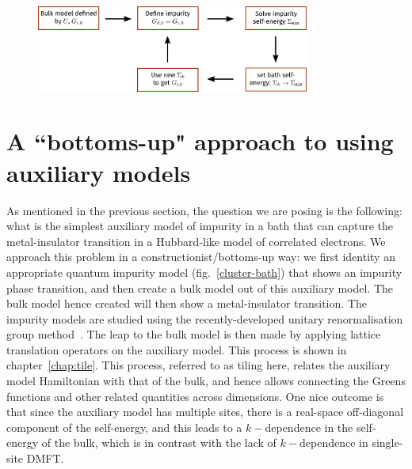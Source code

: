 \documentclass{report}
\numberwithin{equation}{section}
\begin{document}
\begin{figure}[!htb]
	\centering
	\includegraphics[width=0.8\textwidth]{../figures/dmft.pdf}
\end{figure}


\section{A ``bottoms-up" approach to using auxiliary models}
As mentioned in the previous section, the question we are posing is the following: what is the simplest auxiliary model of impurity in a bath that can capture the metal-insulator transition in a Hubbard-like model of correlated electrons. We approach this problem in a constructionist/bottoms-up way: we first identity an appropriate quantum impurity model (fig.~\ref{cluster-bath}) that shows an impurity phase transition, and then create a bulk model out of this auxiliary model. The bulk model hence created will then show a metal-insulator transition. The impurity models are studied using the recently-developed unitary renormalisation group method~\cite{anirbanmott1,anirbanmott2,anirbanurg1,anirbanurg2,siddharthacpi,santanukagome}. The leap to the bulk model is then made by applying lattice translation operators on the auxiliary model. This process is shown in chapter~\ref{chap:tile}. This process, referred to as tiling here, relates the auxiliary model Hamiltonian with that of the bulk, and hence allows connecting the Greens functions and other related quantities across dimensions. One nice outcome is that since the auxiliary model has multiple sites, there is a real-space off-diagonal component of the self-energy, and this leads to a \(k-\)dependence in the self-energy of the bulk, which is in contrast with the lack of \(k-\)dependence in single-site DMFT.  
\end{document}
